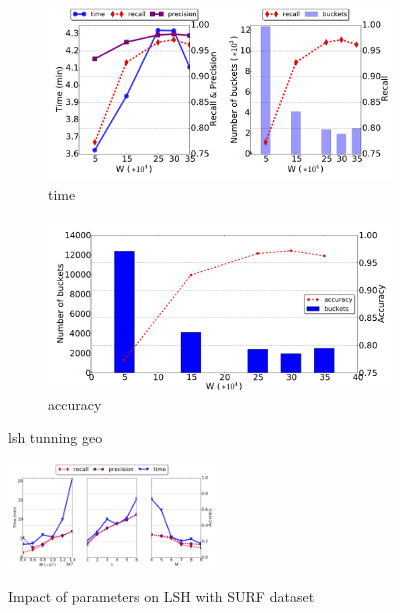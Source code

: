  \begin{figure}[!h]
 \centering
		\begin{subfigure}[b]{0.25\textwidth}
                 \includegraphics[width=\textwidth]{img-perf/perso/lsh/params_geo_time.pdf} 
                \caption{time}
                \label{fig:lsh_tunning_geo_time}
        \end{subfigure}%
		\begin{subfigure}[b]{0.25\textwidth}
                 \includegraphics[width=\textwidth]{img-perf/perso/lsh/params_geo_acc.pdf} 
                \caption{accuracy}
                \label{fig:lsh_tunning_geo_acc}
        \end{subfigure}
         \caption{lsh tunning geo}
                \label{fig:lsh_tunning_geo}
\end{figure}

\begin{figure}[!h]
         \centering
                 \includegraphics[width=0.5\textwidth]{img-perf/perso/lsh/params_surf.pdf} 
                \label{dim_acc}
         \caption{Impact of parameters on LSH with SURF dataset}
          \label{fig:lsh_tunning_surf}
\end{figure}